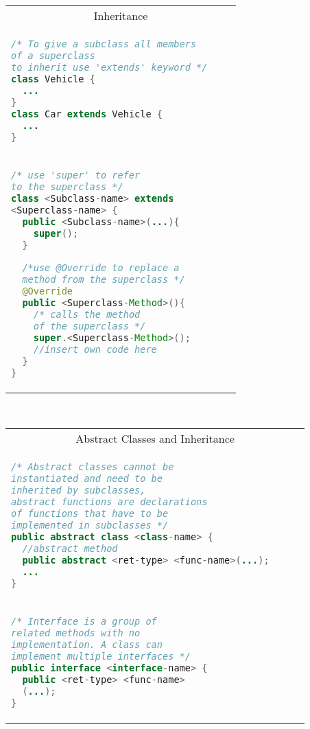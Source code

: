 \documentclass[a4paper, 8pt]{extarticle}
\begin{document}
\begin{minipage}[t]{0.25\linewidth}\vspace{0pt}

\begin{tabular}{|p{0.9\linewidth}|}
\multicolumn{1}{|c|}{\cellcolor{headcol}\color{white}Inheritance}\\
\begin{lstlisting}[language=Java, aboveskip=-2pt,belowskip=-5pt]
/* To give a subclass all members
of a superclass
to inherit use 'extends' keyword */
class Vehicle {
  ...
}
class Car extends Vehicle {
  ...
}
\end{lstlisting}
\\[-8pt]
\begin{lstlisting}[language=Java, aboveskip=0pt,belowskip=-7pt]
/* use 'super' to refer 
to the superclass */
class <Subclass-name> extends 
<Superclass-name> {
  public <Subclass-name>(...){
    super();
  }

  /*use @Override to replace a 
  method from the superclass */
  @Override
  public <Superclass-Method>(){
    /* calls the method
    of the superclass */
    super.<Superclass-Method>();
    //insert own code here
  }
}\end{lstlisting}
\\[3pt]\hline
\end{tabular}
\\[3pt]
\begin{tabular}{|p{0.9\linewidth}|}
\multicolumn{1}{|c|}{\cellcolor{headcol}\color{white}Abstract Classes and Inheritance}\\
\begin{lstlisting}[language=Java, aboveskip=-2pt,belowskip=-7pt]
/* Abstract classes cannot be 
instantiated and need to be 
inherited by subclasses, 
abstract functions are declarations 
of functions that have to be 
implemented in subclasses */
public abstract class <class-name> {
  //abstract method
  public abstract <ret-type> <func-name>(...);
  ...
}
\end{lstlisting}
\\[-8pt]
\begin{lstlisting}[language=Java, aboveskip=0pt,belowskip=2pt]
/* Interface is a group of 
related methods with no 
implementation. A class can 
implement multiple interfaces */
public interface <interface-name> {
  public <ret-type> <func-name>
  (...);
}


\end{lstlisting}
\end{tabular}
\end{minipage}
\end{document}
